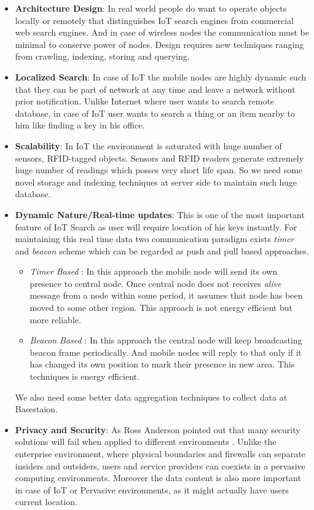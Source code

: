 \documentclass [a4paper,12pt]{book}
\begin{document}
\begin{itemize}
\item \textbf{Architecture Design}: In real world people do want to operate objects locally or remotely that distinguishes IoT search engines from commercial web search engines. And in case of wireless nodes the communication must be minimal to conserve power of nodes. Design requires new techniques ranging from crawling, indexing, storing and querying.
\item \textbf{Localized Search}: In case of IoT the mobile nodes are highly dynamic such that they can be part of network at any time and leave a network without prior notification. Unlike Internet where user wants to search remote database, in case of IoT user wants to search a thing or an item nearby to him like finding a key in his office.
\item \textbf{Scalability}: In IoT the environment is saturated with huge number of sensors, RFID-tagged objects. Sensors and RFID readers generate extremely huge number of readings which posses very short life span. So we need some novel storage and indexing techniques at server side to maintain such huge database.
\item \textbf{Dynamic Nature/Real-time updates}: This is one of the most important feature of IoT Search as user will require location of his keys instantly. For maintaining this real time data two communication paradigm exists \emph{timer} and \emph{beacon} scheme which can be regarded as push and pull based approaches.
\begin{itemize}
\item \emph{Timer Based} : In this approach the mobile node will send its own presence to central node. Once central node does not receives \emph{alive} message from a node within some period, it assumes that node has been moved to some other region. This approach is not energy efficient but more reliable.
\item \emph{Beacon Based} : In this approach the central node will keep broadcasting beacon frame periodically. And mobile nodes will reply to that only if it has changed its own position to mark their presence in new area. This techniques is energy efficient.
\end{itemize}
We also need some better data aggregation techniques to collect data at Basestaion.
\item \textbf{Privacy and Security}: As Ross Anderson pointed out that many security solutions will  fail when applied to different environments \cite{10}. Unlike the enterprise environment, where physical boundaries and firewalls can separate insiders and outsiders, users and service providers can coexists in a pervasive computing environments. Moreover the data content is also more important in case of IoT or Pervasive environments, as it might actually have users current location.
\end{itemize}
\end{document}
